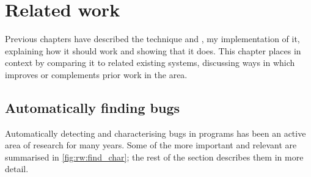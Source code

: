 \chapter{Related work}
\label{chapter:related_work}

Previous chapters have described the {\technique} technique and
{\implementation}, my implementation of it, explaining how it should
work and showing that it does.  This chapter places {\technique} in
context by comparing it to related existing systems, discussing ways
in which {\technique} improves or complements prior work in the area.

\section{Automatically finding bugs}

Automatically detecting and characterising bugs in programs has been
an active area of research for many years.  Some of the more important
and relevant are summarised in \autoref{fig:rw:find_char}; the rest of
the section describes them in more detail.


